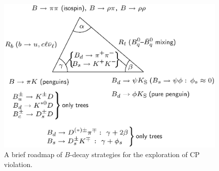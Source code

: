 \documentclass[11pt]{cernrep}
\begin{document}
\begin{figure}
   \centering
   \includegraphics[width=9.0truecm]{flavour-map-bw.ps} 
   \caption{A brief roadmap of $B$-decay strategies for the exploration of
   CP violation.}
   \label{fig:flavour-map}
\end{figure}
\end{document}
